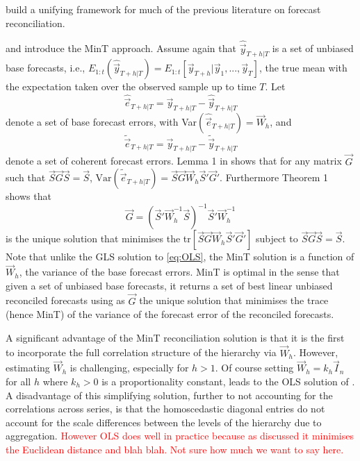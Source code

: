 \documentclass[graybox]{svmult}
\begin{document}
\cite{WicEtAl2019} build a unifying framework for much of the previous literature on forecast reconciliation.

 and introduce the MinT approach. Assume again that $\hat{\vec{y}}_{T+h|T}$ is a set of unbiased base forecasts, i.e., $E_{1:t}(\hat{\vec{y}}_{T+h|T})= E_{1:t}[\vec{y}_{T+h}|\vec{y}_1,...,\vec{y}_T]$, the true mean with the expectation taken over the observed sample up to time $T$.
Let
\begin{equation}\label{eq:base errors}
\hat{\vec{e}}_{T+h|T} = \vec{y}_{T+h|T}-\hat{\vec{y}}_{T+h|T}
\end{equation}
denote a set of base forecast errors, with Var$(\hat{\vec{e}}_{T+h|T})=\vec{W}_h$, and
\begin{equation*}
\tilde{\vec{e}}_{T+h|T} = \vec{y}_{T+h|T}-\tilde{\vec{y}}_{T+h|T}
\end{equation*} denote a set of coherent forecast errors. Lemma 1 in \cite{WicEtAl2019} shows that for any matrix $\vec{G}$ such that $\vec{S}\vec{G}\vec{S}=\vec{S}$, $\text{Var}(\tilde{\vec{e}}_{T+h|T})=\vec{S}\vec{G}\vec{W}_h\vec{S}'\vec{G}'
$. Furthermore Theorem 1 shows that
\begin{equation} \label{eq:MinT}
\vec{G} = (\vec{S}'{\vec{W}}^{-1}_h\vec{S})^{-1}\vec{S}'{\vec{W}}^{-1}_h
\end{equation}
is the unique solution that minimises the tr$[\vec{S}\vec{G}\vec{W}_h\vec{S}'\vec{G}']$ subject to $\vec{S}\vec{G}\vec{S}=\vec{S}$. Note that unlike the GLS solution to \eqref{eq:OLS}, the MinT solution is a function of $\vec{W}_h$, the variance of the base forecast errors. MinT is optimal in the sense that given a set of unbiased base forecasts, it returns a set of best linear unbiased reconciled forecasts using as $\vec{G}$ the unique solution that minimises the trace (hence MinT) of the variance of the forecast error of the reconciled forecasts.

A significant advantage of the MinT reconciliation solution is that it is the first to incorporate the full correlation structure of the hierarchy via ${\vec{W}}_{h}$. However, estimating ${\vec{W}}_{h}$ is challenging, especially for $h>1$. Of course setting ${\vec{W}}_{h}=k_h\vec{I}_n$ for all $h$ where $k_h>0$ is a proportionality constant, leads to the OLS solution of \cite{HynEtAl2011}. A disadvantage of this simplifying solution, further to not accounting for the correlations across series, is that the homoscedastic diagonal entries do not account for the scale differences between the levels of the hierarchy due to aggregation. \textcolor{red}{However OLS does well in practice because as discussed it minimises the Euclidean distance and blah blah. Not sure how much we want to say here.}
\end{document}
